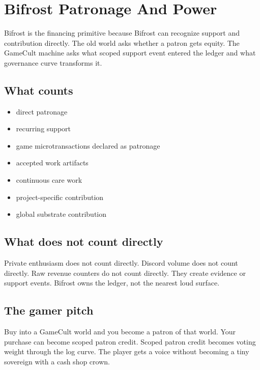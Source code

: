 \chapter{Bifrost Patronage And Power}

Bifrost is the financing primitive because Bifrost can recognize support and contribution directly. The old world asks whether a patron gets equity. The GameCult machine asks what scoped support event entered the ledger and what governance curve transforms it.



\section{What counts}

\begin{itemize}
  \item direct patronage
  \item recurring support
  \item game microtransactions declared as patronage
  \item accepted work artifacts
  \item continuous care work
  \item project-specific contribution
  \item global substrate contribution
\end{itemize}

\section{What does not count directly}

Private enthusiasm does not count directly. Discord volume does not count directly. Raw revenue counters do not count directly. They create evidence or support events. Bifrost owns the ledger, not the nearest loud surface.

\section{The gamer pitch}

Buy into a GameCult world and you become a patron of that world. Your purchase can become scoped patron credit. Scoped patron credit becomes voting weight through the log curve. The player gets a voice without becoming a tiny sovereign with a cash shop crown.
